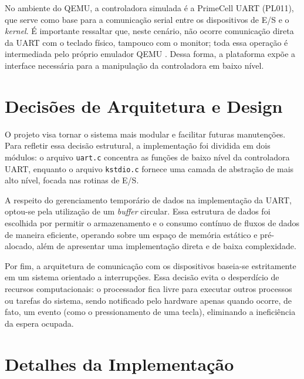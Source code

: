 No ambiente do QEMU, a controladora simulada é a PrimeCell UART (PL011), que serve como base para a comunicação serial entre os dispositivos de E/S e o \textit{kernel}. É importante ressaltar que, neste cenário, não ocorre comunicação direta da UART com o teclado físico, tampouco com o monitor; toda essa operação é intermediada pelo próprio emulador QEMU \cite{ekasiswanto:qemu-uart}. Dessa forma, a plataforma expõe a interface necessária para a manipulação da controladora em baixo nível.


\section{Decisões de Arquitetura e Design}

O projeto visa tornar o sistema mais modular e facilitar futuras manutenções. Para refletir essa decisão estrutural, a implementação foi dividida em dois módulos: o arquivo \texttt{uart.c} concentra as funções de baixo nível da controladora UART, enquanto o arquivo \texttt{kstdio.c} fornece uma camada de abstração de mais alto nível, focada nas rotinas de E/S.

A respeito do gerenciamento temporário de dados na implementação da UART, optou-se pela utilização de um \textit{buffer} circular. Essa estrutura de dados foi escolhida por permitir o armazenamento e o consumo contínuo de fluxos de dados de maneira eficiente, operando sobre um espaço de memória estático e pré-alocado, além de apresentar uma implementação direta e de baixa complexidade.

Por fim, a arquitetura de comunicação com os dispositivos baseia-se estritamente em um sistema orientado a interrupções. Essa decisão evita o desperdício de recursos computacionais: o processador fica livre para executar outros processos ou tarefas do sistema, sendo notificado pelo hardware apenas quando ocorre, de fato, um evento (como o pressionamento de uma tecla), eliminando a ineficiência da espera ocupada.


\section{Detalhes da Implementação}

